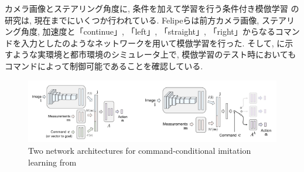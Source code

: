 \newpage






カメラ画像とステアリング角度に, 条件を加えて学習を行う条件付き模倣学習
の研究は, 現在までにいくつか行われている.
Felipeら\cite{felipe}は前方カメラ画像, ステアリング角度, 加速度と「continue」, 「left」, 「straight」, 「right」からなるコマンドを入力としたのようなネットワークを用いて模倣学習を行った. そして, に示すような実環境と都市環境のシミュレータ上で, 模倣学習のテスト時においてもコマンドによって制御可能であることを確認している.

\vspace{0.5cm}

\begin{figure}[hbtp]
     \centering
    \includegraphics[keepaspectratio, scale=0.65]
         {images/felipe_network.png}
    \caption{Two network architectures for command-conditional imitation learning from \cite{felipe}}
    \label{Fig:felipe_network}
\end{figure}


